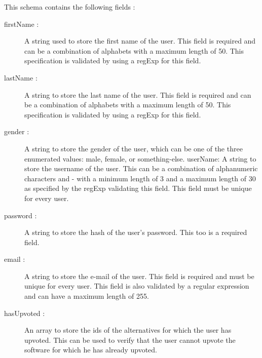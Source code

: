 This schema contains the following fields :

\begin{description}

\item[firstName : ]
A string used to store the first name of the user. This field is required and can be a combination of alphabets with a maximum length of 50. This specification is validated by using a regExp for this field.

\item[lastName : ]
A string to store the last name of the user. This field is required and can be a combination of alphabets with a maximum length of 50. This specification is validated by using a regExp for this field.

\item[gender : ]
A string to store the gender of the user, which can be one of the three enumerated values: male, female, or something-else.
userName: A string to store the username of the user. This can be a combination of alphanumeric characters and - with a minimum length of 3 and a maximum length of 30 as specified by the regExp validating this field. This field must be unique for every user.

\item[password : ]
A string to store the hash of the user’s password. This too is a required field.

\item[email : ]
A string to store the e-mail of the user. This field is required and must be unique for every user. This field is also validated by a regular expression and can have a maximum length of 255.

\item[hasUpvoted : ]
An array to store the ids of the alternatives for which the user has upvoted. This can be used to verify that the user cannot upvote the software for which he has already upvoted.
\end{description}


































